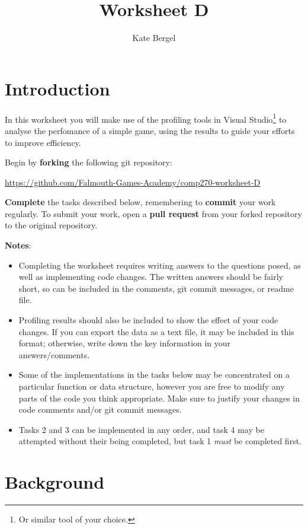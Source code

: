 \documentclass{../../../fal_assignment}
\title{Worksheet D}
\author{Kate Bergel}
\begin{document}
\maketitle

\section*{Introduction}

In this worksheet you will make use of the profiling tools in Visual Studio\footnote{Or similar tool of your choice.} to analyse the perfomance of a simple game, using the results to guide your efforts to improve efficiency.

Begin by \textbf{forking} the following git repository:

\begin{center}
	\url{https://github.com/Falmouth-Games-Academy/comp270-worksheet-D}
\end{center}

\textbf{Complete} the tasks described below, remembering to \textbf{commit} your work regularly.
To submit your work, open a \textbf{pull request} from your forked repository to the original repository.

\textbf{Notes}:
\begin{itemize}
	\item Completing the worksheet requires writing answers to the questions posed, as well as implementing code changes. The written answers should be fairly short, so can be included in the comments, git commit messages, or readme file.
	\item Profiling results should also be included to show the effect of your code changes. If you can export the data as a text file, it may be included in this format; otherwise, write down the key information in your answers/comments.
	\item Some of the implementations in the tasks below may be concentrated on a particular function or data structure, however you are free to modify any parts of the code you think appropriate. Make sure to justify your changes in code comments and/or git commit messages.
	\item Tasks 2 and 3 can be implemented in any order, and task 4 may be attempted without their being completed, but task 1 \textit{must} be completed first.
\end{itemize}

\section*{Background}
\end{document}
